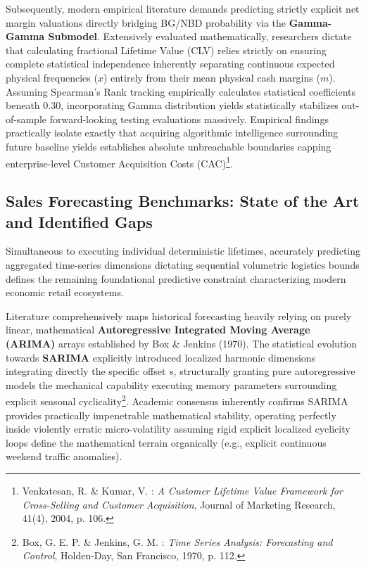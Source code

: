 \documentclass[12pt,a4paper]{report}
\begin{document}
Subsequently, modern empirical literature demands predicting strictly explicit net margin valuations directly bridging BG/NBD probability via the \textbf{Gamma-Gamma Submodel}. Extensively evaluated mathematically, researchers dictate that calculating fractional Lifetime Value (CLV) relies strictly on ensuring complete statistical independence inherently separating continuous expected physical frequencies ($x$) entirely from their mean physical cash margins ($m$). Assuming Spearman’s Rank tracking empirically calculates statistical coefficients beneath $0.30$, incorporating Gamma distribution yields statistically stabilizes out-of-sample forward-looking testing evaluations massively. Empirical findings practically isolate exactly that acquiring algorithmic intelligence surrounding future baseline yields establishes absolute unbreachable boundaries capping enterprise-level Customer Acquisition Costs (CAC)\footnote{Venkatesan, R. \& Kumar, V. : \textit{A Customer Lifetime Value Framework for Cross-Selling and Customer Acquisition}, Journal of Marketing Research, 41(4), 2004, p. 106.}.

\subsection{Sales Forecasting Benchmarks: State of the Art and Identified Gaps}
Simultaneous to executing individual deterministic lifetimes, accurately predicting aggregated time-series dimensions dictating sequential volumetric logistics bounds defines the remaining foundational predictive constraint characterizing modern economic retail ecosystems.

Literature comprehensively maps historical forecasting heavily relying on purely linear, mathematical \textbf{Autoregressive Integrated Moving Average (ARIMA)} arrays established by Box \& Jenkins (1970). The statistical evolution towards \textbf{SARIMA} explicitly introduced localized harmonic dimensions integrating directly the specific offset $s$, structurally granting pure autoregressive models the mechanical capability executing memory parameters surrounding explicit seasonal cyclicality\footnote{Box, G. E. P. \& Jenkins, G. M. : \textit{Time Series Analysis: Forecasting and Control}, Holden-Day, San Francisco, 1970, p. 112.}. Academic consensus inherently confirms SARIMA provides practically impenetrable mathematical stability, operating perfectly inside violently erratic micro-volatility assuming rigid explicit localized cyclicity loops define the mathematical terrain organically (e.g., explicit continuous weekend traffic anomalies).
\end{document}
